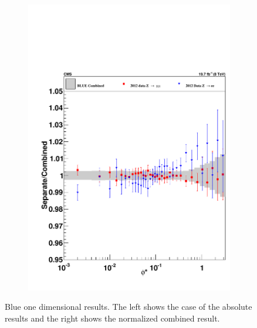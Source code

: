 \begin{figure}
\begin{subfigure}[b]{0.49\textwidth}
    \includegraphics[width=\linewidth]{figures/Results/BlueOneDNorm.pdf}
    \end{subfigure}
    \caption[Blue one dimensional results]{Blue one dimensional results. The left shows the case of the absolute results and the right shows the normalized combined result.}
    \label{fig:Blue1D}
\end{figure}




